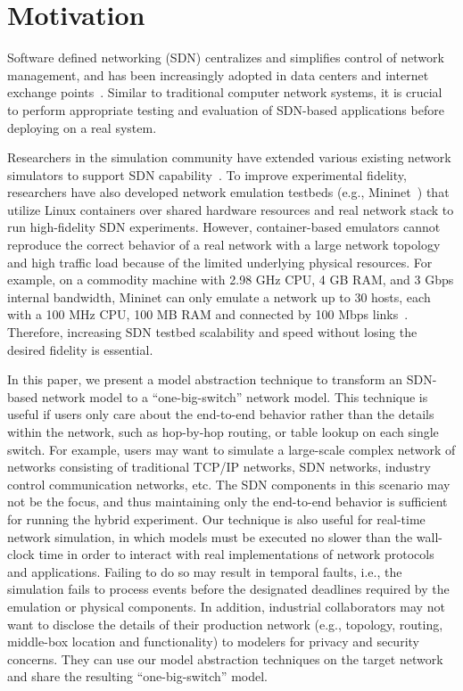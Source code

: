 \section{Motivation}

Software defined networking (SDN) centralizes and simplifies control of network management,
and has been increasingly adopted in data centers and internet exchange points~\cite{B4, Meridian, SDX}.
Similar to traditional computer network systems, it is crucial to perform appropriate testing and evaluation of
SDN-based applications before deploying on a real system.

Researchers in the simulation community have extended various existing network simulators to support SDN capability~\cite{S3F, NS3, OPNET}.
To improve experimental fidelity, researchers have also developed network emulation testbeds
(e.g., Mininet~\cite{Mininet}) that utilize Linux containers over shared hardware resources and
real network stack to run high-fidelity SDN experiments.
However, container-based emulators cannot reproduce the correct behavior of a real network
with a large network topology and high traffic load because of the limited underlying physical resources.
For example, on a commodity machine with 2.98 GHz CPU, 4 GB RAM, and 3 Gbps internal bandwidth,
Mininet can only emulate a network up to 30 hosts, each with a 100 MHz CPU, 100 MB RAM and connected by 100 Mbps links~\cite{ReproNetExprCBE}.
Therefore, increasing SDN testbed scalability and speed without losing the desired fidelity is essential.

In this paper, we present a model abstraction technique to transform an SDN-based network model to a ``one-big-switch'' network model.
This technique is useful if users only care about the end-to-end behavior rather than
the details within the network, such as hop-by-hop routing, or table lookup on each single switch.
For example, users may want to simulate a large-scale complex network of networks consisting of traditional TCP/IP networks,
SDN networks, industry control communication networks, etc.
The SDN components in this scenario may not be the focus, and thus maintaining only the end-to-end behavior is sufficient for running the hybrid experiment.
Our technique is also useful for real-time network simulation, in which models must be executed
no slower than the wall-clock time in order to interact with real implementations of network protocols and applications.
Failing to do so may result in temporal faults, i.e., the simulation fails to process events before the designated deadlines
required by the emulation or physical components. 
In addition, industrial collaborators may not want to disclose the details of their production network
(e.g., topology, routing, middle-box location and functionality) to modelers for privacy and security concerns.
They can use our model abstraction techniques on the target network and share the resulting ``one-big-switch'' model.

